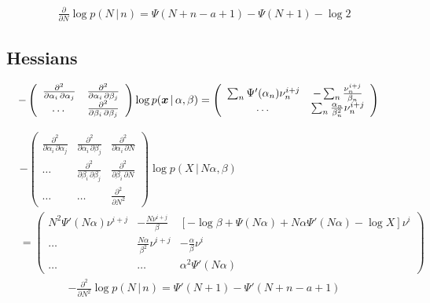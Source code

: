 \documentclass[11pt]{article}
\newcommand{\cond}{\,|\,}
\newcommand{\firstDeriv}[1]{\frac{\partial}{\partial #1}}
\newcommand{\secDeriv}[1]{\frac{\partial^2}{\partial #1^2}} %
\newcommand{\secPartial}[2]{\frac{\partial^2}{\partial #1 \, \partial #2}} %
\begin{document}
\begin{align}
  \label{eq:grad-nb}
  \firstDeriv{N} \log p(N \cond n) = \Psi(N+n-a+1) - \Psi(N+1) - \log 2
\end{align}

\subsection{Hessians} \label{sec:hessians}

\begin{align}
  \label{eq:hess-posterior}
    - \left(
    \begin{array}{ccc}
      \secPartial{\alpha_i}{\alpha_j} & \secPartial{\alpha_i}{\beta_j}\\
      \dots & \secPartial{\beta_i}{\beta_j}
    \end{array}
  \right) \log p(\bmx \cond \alpha, \beta)
    &= \left(
    \begin{array}{cc}
      \sum_n \Psi'(\alpha_n) \nu_n^{i+j} & -\sum_n \frac{\nu_n^{i+j}}{\beta_n}\\
      \dots & \sum_n \frac{\alpha_n}{\beta_n^2} \nu_n^{i+j}
    \end{array}
  \right)
\end{align}

 \begin{align}
  \label{eq:hess-prediction}
  & - \left(
    \begin{array}{ccc}
      \secPartial{\alpha_i}{\alpha_j} & \secPartial{\alpha_i}{\beta_j} & \secPartial{\alpha_i}{N}\\
      \dots & \secPartial{\beta_i}{\beta_j} & \secPartial{\beta_i}{N}\\
      \dots & \dots & \secDeriv{N}
    \end{array}
  \right) \log p(X \cond N \alpha, \beta)
  \\
  &=
  \left(
    \begin{array}{ccc}
      N^2 \Psi'(N \alpha) \nu^{i+j} & -\frac{N \nu^{i+j}}{\beta} & \left[ -\log \beta +\Psi(N \alpha) + N \alpha \Psi'(N \alpha) - \log X \right] \nu^{i}\\
      \dots &  \frac{N\alpha}{\beta^2} \nu^{i+j} & -\frac{\alpha}{\beta} \nu^{i} \\
      \dots & \dots & \alpha^2 \Psi'(N \alpha)
    \end{array}
  \right)
\end{align}
\begin{align}
  \label{eq:hess-nb}
   - \secDeriv{N} \log p(N \cond n) = \Psi'(N+1) - \Psi'(N+n-a+1)
\end{align}



\end{document}
